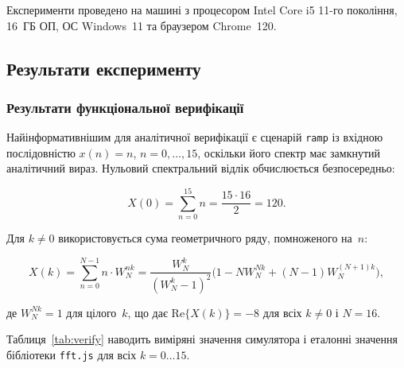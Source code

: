 Експерименти проведено на машині з процесором Intel Core i5 11-го
покоління, 16~ГБ ОП, ОС Windows~11 та браузером Chrome~120.


\subsection{Результати експерименту}

\subsubsection*{Результати функціональної верифікації}

Найінформативнішим для аналітичної верифікації є сценарій \texttt{ramp}
із вхідною послідовністю $x(n) = n$, $n = 0,\ldots,15$, оскільки його
спектр має замкнутий аналітичний вираз. Нульовий спектральний відлік
обчислюється безпосередньо:

\begin{equation}
  X(0) = \sum_{n=0}^{15} n = \frac{15 \cdot 16}{2} = 120.
  \label{eq:ramp_X0}
\end{equation}

Для $k \neq 0$ використовується сума геометричного ряду, помноженого
на~$n$:

\begin{equation}
  X(k) = \sum_{n=0}^{N-1} n \cdot W_N^{nk}
       = \frac{W_N^k}{(W_N^k - 1)^2}\bigl(1 - N W_N^{Nk} + (N-1) W_N^{(N+1)k}\bigr),
  \label{eq:ramp_Xk}
\end{equation}

де $W_N^{Nk} = 1$ для цілого~$k$, що дає $\mathrm{Re}\{X(k)\} = -8$
для всіх $k \neq 0$ і $N = 16$.

Таблиця~\ref{tab:verify} наводить виміряні значення симулятора і
еталонні значення бібліотеки \texttt{fft.js} для всіх $k = 0\ldots15$.

